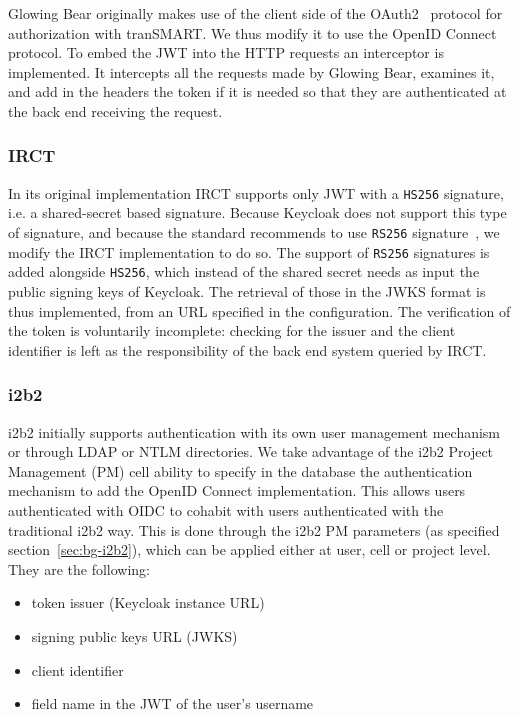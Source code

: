 Glowing Bear originally makes use of the client side of the OAuth2~\cite{oauth2} protocol for authorization with tranSMART. 
We thus modify it to use the OpenID Connect protocol.
To embed the JWT into the HTTP requests an interceptor is implemented. 
It intercepts all the requests made by Glowing Bear, examines it, and add in the headers the token if it is needed so that they are authenticated at the back end receiving the request.

\subsubsection{IRCT}

In its original implementation IRCT supports only JWT with a \verb|HS256| signature, i.e. a shared-secret based signature. 
Because Keycloak does not support this type of signature, and because the standard recommends to use \verb|RS256| signature~\cite{todo}, we modify the IRCT implementation to do so. 
The support of \verb|RS256| signatures is added alongside \verb|HS256|, which instead of the shared secret needs as input the public signing keys of Keycloak.
The retrieval of those in the JWKS format is thus implemented, from an URL specified in the configuration.
The verification of the token is voluntarily incomplete: checking for the issuer and the client identifier is left as the responsibility of the back end system queried by IRCT.

\subsubsection{i2b2}

i2b2 initially supports authentication with its own user management mechanism or through LDAP or NTLM directories.
We take advantage of the i2b2 Project Management (PM) cell ability to specify in the database the authentication mechanism to add the OpenID Connect implementation.
This allows users authenticated with OIDC to cohabit with users authenticated with the traditional i2b2 way.
This is done through the i2b2 PM parameters (as specified section~\ref{sec:bg-i2b2}), which can be applied either at user, cell or project level. 
They are the following:

\begin{itemize}
    \item token issuer (Keycloak instance URL)
    \item signing public keys URL (JWKS)
    \item client identifier
    \item field name in the JWT of the user's username
\end{itemize}


